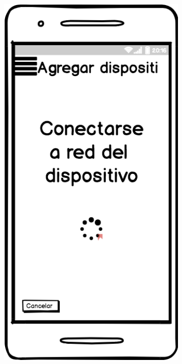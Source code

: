 \begin{figure}[H]
\begin{subfigure}[b]{0.20\textwidth}
    \label{fig:balsamiq}
  \end{subfigure}
  \begin{subfigure}[b]{0.20\textwidth}
    \includegraphics[width=\textwidth, keepaspectratio]{images/balsamiq02}

\end{subfigure}
\end{figure}
